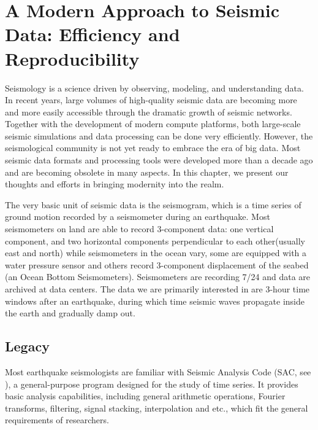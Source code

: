 \section{A Modern Approach to Seismic Data: Efficiency and Reproducibility}
\label{sec:asdf}

Seismology is a science driven by observing, modeling, and
understanding data. In recent years, large volumes of high-quality seismic data
are becoming more and more easily accessible through the dramatic growth of
seismic networks. Together with the development of modern compute platforms,
both large-scale seismic simulations and data processing can be done
very efficiently. However, the  seismological community is not yet ready to
embrace the era of big data. Most seismic data formats and processing
tools were developed more than a decade ago and are becoming obsolete in many
aspects. In this chapter, we present our thoughts and efforts in bringing
modernity into the realm.


The very basic unit of seismic data is the seismogram, which is a time series of
ground motion recorded by a seismometer during an earthquake. Most seismometers on
land are able to record 3-component data: one vertical component, and two
horizontal components perpendicular to each other(usually east and north) while
seismometers in the ocean vary, some are equipped with a water pressure sensor and
others record 3-component displacement of the seabed (an Ocean Bottom
Seismometers). Seismometers are recording 7/24 and data are archived at data
centers. The data we are primarily interested in are 3-hour time windows after
an earthquake, during which time seismic waves propagate inside the
earth and gradually damp out.

\subsection{Legacy}

Most earthquake seismologists are familiar with Seismic Analysis Code (SAC, see
\cite{HelffrichWookeyBastow201311}), a general-purpose program designed for the
study of time series. It provides basic analysis capabilities, including general
arithmetic operations, Fourier transforms, filtering, signal stacking,
interpolation and etc., which fit the general requirements of researchers.


